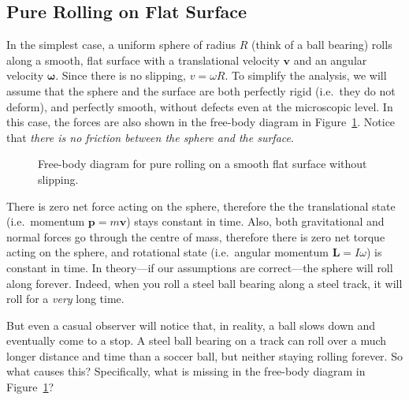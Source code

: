 \subsection{Pure Rolling on Flat Surface}
\label{no-slip-ball}
In the simplest case, a uniform sphere of radius $R$ (think of a ball bearing)
rolls along a smooth, flat surface with a translational velocity $\bm v$ and an
angular velocity $\bm\omega$. Since there is no slipping, $v=\omega R$. To
simplify the analysis, we will assume that the sphere and the surface are both
perfectly rigid (i.e.\ they do not deform), and perfectly smooth, without
defects even at the microscopic level. In this case, the forces are also shown
in the free-body diagram in Figure~\ref{roll-flat}. Notice that
\emph{there is no friction between the sphere and the surface}.
\begin{figure}[!ht]
  \centering
  \caption{Free-body diagram for pure rolling on a smooth flat surface without
    slipping.}
  \label{roll-flat}
\end{figure}
There is zero net force acting on the sphere, therefore the the translational
state (i.e.\ momentum $\bm p=m\bm v$) stays constant in time. Also, both
gravitational and normal forces go through the centre of mass, therefore there
is zero net torque acting on the sphere, and rotational state (i.e.\ angular
momentum $\bm L=I\omega$) is constant in time. In theory---if our assumptions
are correct---the sphere will roll along forever. Indeed, when you roll a steel
ball bearing along a steel track, it will roll for a \emph{very} long time.

But even a casual observer will notice that, in reality, a ball slows down and
eventually come to a stop. A steel ball bearing on a track can roll over a
much longer distance and time than a soccer ball, but neither staying rolling
forever. So what causes this? Specifically, what is missing in the free-body
diagram in Figure~\ref{roll-flat}?

